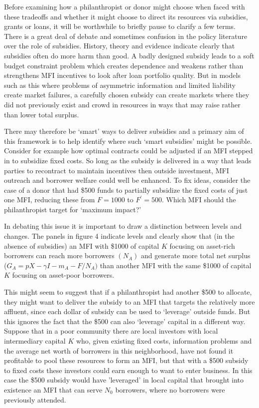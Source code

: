 \documentclass[
]{article}
\begin{document}
Before examining how a philanthropist or donor might choose when faced
with these tradeoffs and whether it might choose to direct its resources
via subsidies, grants or loans, it will be worthwhile to briefly pause
to clarify a few terms. There is a great deal of debate and sometimes
confusion in the policy literature over the role of subsidies. History,
theory and evidence indicate clearly that subsidies often do more harm
than good. A badly designed subsidy leads to a soft budget constraint
problem which creates dependence and weakens rather than strengthens MFI
incentives to look after loan portfolio quality. But in models such as
this where problems of asymmetric information and limited liability
create market failures, a carefully chosen subsidy can create markets
where they did not previously exist and crowd in resources in ways that
may raise rather than lower total surplus.

There may therefore be `smart' ways to deliver subsidies and a primary
aim of this framework is to help identify where such `smart subsidies'
might be possible. Consider for example how optimal contracts could be
adjusted if an MFI stepped in to subsidize fixed costs. So long as the
subsidy is delivered in a way that leads parties to recontract to
maintain incentives then outside investment, MFI outreach and borrower
welfare could well be enhanced. To fix ideas, consider the case of a
donor that had \$500 funds to partially subsidize the fixed costs of
just one MFI, reducing these from \(F = 1000\) to \(F^{'} = 500.\) Which
MFI should the philanthropist target for `maximum impact?'

In debating this issue it is important to draw a distinction between
levels and changes. The panels in figure 4 indicate levels and clearly
show that (in the absence of subsidies) an MFI with \$1000 of capital
\(K\) focusing on asset-rich borrowers can reach more borrowers
\((N_{A})\) and generate more total net surplus
(\(G_{A} = pX - \gamma I - m_{A} - F/N_{A})\) than another MFI with the
same \$1000 of capital \(K\) focusing on asset-poor borrowers.

This might seem to suggest that if a philanthropist had another \$500 to
allocate, they might want to deliver the subsidy to an MFI that targets
the relatively more affluent, since each dollar of subsidy can be used
to `leverage' outside funds. But this ignores the fact that the \$500
can also `leverage' capital in a different way. Suppose that in a poor
community there are local investors with local intermediary capital
\(K\) who, given existing fixed costs, information problems and the
average net worth of borrowers in this neighborhood, have not found it
profitable to pool these resources to form an MFI, but that with a \$500
subsidy to fixed costs these investors could earn enough to want to
enter business. In this case the \$500 subsidy would have 'leveraged' in
local capital that brought into existence an MFI that can serve
\(N_{0}\) borrowers, where no borrowers were previously attended.
\end{document}
